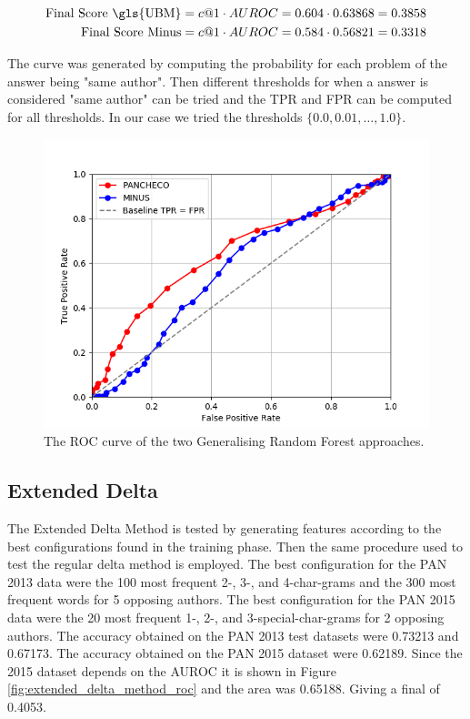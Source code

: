 \begin{align}
    \text{Final Score \gls{UBM}} &= c@1 \cdot AUROC = 0.604 \cdot 0.63868 = 0.3858  \\
    \text{Final Score Minus} &= c@1 \cdot AUROC = 0.584 \cdot 0.56821 = 0.3318
\end{align}

The curve was generated by computing the probability for each problem of the
answer being "same author". Then different thresholds for when a answer is
considered "same author" can be tried and the \gls{TPR} and \gls{FPR} can be
computed for all thresholds. In our case we tried the thresholds $\{0.0, 0.01,
\dots, 1.0\}$.

\begin{figure}
    \centering
    \includegraphics[width=.7\textwidth]{./pictures/forest_roc.png}
    \caption{The ROC curve of the two Generalising Random Forest
    approaches.}
    \label{fig:forest_roc}
\end{figure}

\subsection{Extended Delta} \label{subsec:results:extended_delta}
The Extended Delta Method is tested by generating features according to the best
configurations found in the training phase. Then the same procedure used to test
the regular delta method is employed. The best configuration for the PAN 2013
data were the 100 most frequent 2-, 3-, and 4-char-grams and the 300 most
frequent words for 5 opposing authors. The best configuration for the PAN 2015
data were the 20 most frequent 1-, 2-, and 3-special-char-grams for 2 opposing
authors. The accuracy obtained on the PAN 2013 test datasets were 0.73213 and
0.67173. The accuracy obtained on the PAN 2015 dataset were 0.62189. Since the
2015 dataset depends on the \gls{AUROC} it is shown in Figure
\ref{fig:extended_delta_method_roc} and the area was 0.65188. Giving a final of
0.4053.

